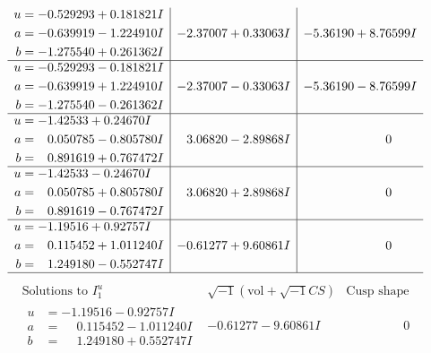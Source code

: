 \documentclass[1p]{elsarticle_modified}
\theoremstyle{definition}
\newcommand{\I}{\sqrt{-1}}
\begin{document}
$$\begin{array}{c|c|c}
\begin{aligned}
u &= -0.529293 + 0.181821 I \\
a &= -0.639919 - 1.224910 I \\
b &= -1.275540 + 0.261362 I\end{aligned}
 & -2.37007 + 0.33063 I & -5.36190 + 8.76599 I \\ \hline\begin{aligned}
u &= -0.529293 - 0.181821 I \\
a &= -0.639919 + 1.224910 I \\
b &= -1.275540 - 0.261362 I\end{aligned}
 & -2.37007 - 0.33063 I & -5.36190 - 8.76599 I \\ \hline\begin{aligned}
u &= -1.42533 + 0.24670 I \\
a &= \phantom{-}0.050785 - 0.805780 I \\
b &= \phantom{-}0.891619 + 0.767472 I\end{aligned}
 & \phantom{-}3.06820 - 2.89868 I & \phantom{-0.000000 } 0 \\ \hline\begin{aligned}
u &= -1.42533 - 0.24670 I \\
a &= \phantom{-}0.050785 + 0.805780 I \\
b &= \phantom{-}0.891619 - 0.767472 I\end{aligned}
 & \phantom{-}3.06820 + 2.89868 I & \phantom{-0.000000 } 0 \\ \hline\begin{aligned}
u &= -1.19516 + 0.92757 I \\
a &= \phantom{-}0.115452 + 1.011240 I \\
b &= \phantom{-}1.249180 - 0.552747 I\end{aligned}
 & -0.61277 + 9.60861 I & \phantom{-0.000000 } 0\\
 \hline 
 \end{array}$$\newpage$$\begin{array}{c|c|c}  
\text{Solutions to }I^u_{1}& \I (\text{vol} + \sqrt{-1}CS) & \text{Cusp shape}\\
 \hline 
\begin{aligned}
u &= -1.19516 - 0.92757 I \\
a &= \phantom{-}0.115452 - 1.011240 I \\
b &= \phantom{-}1.249180 + 0.552747 I\end{aligned}
 & -0.61277 - 9.60861 I & \phantom{-0.000000 } 0 \\ \hline\begin{aligned}

\end{aligned}
\end{array}$$
\end{document}
